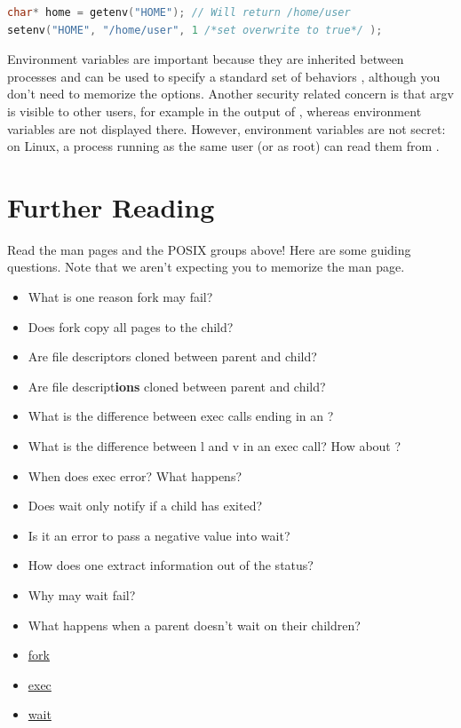\begin{lstlisting}[language=C]
char* home = getenv("HOME"); // Will return /home/user
setenv("HOME", "/home/user", 1 /*set overwrite to true*/ );
\end{lstlisting}

Environment variables are important because they are inherited between processes and can be used to specify a standard set of behaviors \cite{env_std_2018}, although you don't need to memorize the options.
Another security related concern is that argv is visible to other users, for example in the output of , whereas environment variables are not displayed there.
However, environment variables are not secret: on Linux, a process running as the same user (or as root) can read them from .

\section{Further Reading}

Read the man pages and the POSIX groups above!
Here are some guiding questions.
Note that we aren't expecting you to memorize the man page.

\begin{itemize}
\item What is one reason fork may fail?
\item Does fork copy all pages to the child?
\item Are file descriptors cloned between parent and child?
\item Are file descript\textbf{ions} cloned between parent and child?
\item What is the difference between exec calls ending in an ?
\item What is the difference between l and v in an exec call? How about ?
\item When does exec error? What happens?
\item Does wait only notify if a child has exited?
\item Is it an error to pass a negative value into wait?
\item How does one extract information out of the status?
\item Why may wait fail?
\item What happens when a parent doesn't wait on their children?
\end{itemize}

\begin{itemize}
\item \href{http://man7.org/linux/man-pages/man2/fork.2.html}{fork}
\item \href{http://man7.org/linux/man-pages/man3/exec.3.html}{exec}
\item \href{http://man7.org/linux/man-pages/man2/wait.2.html}{wait}
\end{itemize}

